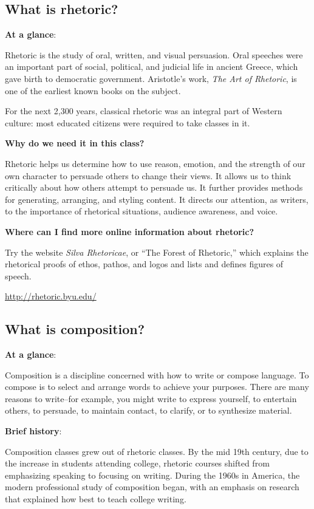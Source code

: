 \documentclass[12pt, hidelinks]{article} %
\begin{document}
\subsection{What is rhetoric?}

\textbf{At a glance}: 

Rhetoric is the study of oral, written, and visual persuasion. Oral speeches were an important part of social, political, and judicial life in ancient Greece, which gave birth to democratic government. Aristotle's work, \emph{The Art of Rhetoric}, is one of the earliest known books on the subject.

 
For the next 2,300 years, classical rhetoric was an integral part of Western culture: most educated citizens were required to take classes in it.
 
\textbf{Why do we need it in this class?} 

Rhetoric helps us determine how to use reason, emotion, and the strength of our own character to persuade others to change their views. It allows us to think critically about how others attempt to persuade us. It further provides methods for generating, arranging, and styling content. It directs our attention, as writers, to the importance of rhetorical situations, audience awareness, and voice.

\textbf{Where can I find more online information about rhetoric?}

Try the website \emph{Silva Rhetoricae}, or ``The Forest of Rhetoric,'' which explains the rhetorical proofs of ethos, pathos, and logos and lists and defines figures of speech.

\url{http://rhetoric.byu.edu/} 

\subsection{What is composition?}

\textbf{At a glance}: 

Composition is a discipline concerned with how to write or compose language. To compose is to select and arrange words to achieve your purposes. There are many reasons to write--for example, you might write to express yourself, to entertain others, to persuade, to maintain contact, to clarify, or to synthesize material.
 
\textbf{Brief history}: 

Composition classes grew out of rhetoric classes. By the mid 19th century, due to the increase in students attending college, rhetoric courses shifted from emphasizing speaking to focusing on writing. During the 1960s in America, the modern professional study of composition began, with an emphasis on research that explained how best to teach college writing.
 
\end{document}
